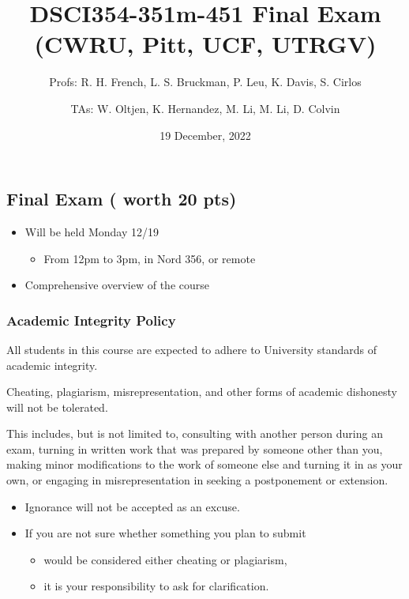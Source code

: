 \documentclass[
]{article}
\title{DSCI354-351m-451 Final Exam (CWRU, Pitt, UCF, UTRGV)}
\subtitle{Profs: R. H. French, L. S. Bruckman, P. Leu, K. Davis, S.
Cirlos}
\author{TAs: W. Oltjen, K. Hernandez, M. Li, M. Li, D. Colvin}
\date{19 December, 2022}
\providecommand{\tightlist}{%
  \setlength{\itemsep}{0pt}\setlength{\parskip}{0pt}}
\begin{document}
\maketitle

{
\hypersetup{linkcolor=}
\setcounter{tocdepth}{6}
\tableofcontents
}
\hypertarget{final-exam-worth-20-pts}{%
\subsection{Final Exam ( worth 20 pts)}\label{final-exam-worth-20-pts}}

\begin{itemize}
\tightlist
\item
  Will be held Monday 12/19

  \begin{itemize}
  \tightlist
  \item
    From 12pm to 3pm, in Nord 356, or remote
  \end{itemize}
\item
  Comprehensive overview of the course
\end{itemize}

\hypertarget{academic-integrity-policy}{%
\subsubsection{Academic Integrity
Policy}\label{academic-integrity-policy}}

All students in this course are expected to adhere to University
standards of academic integrity.

Cheating, plagiarism, misrepresentation, and other forms of academic
dishonesty will not be tolerated.

This includes, but is not limited to, consulting with another person
during an exam, turning in written work that was prepared by someone
other than you, making minor modifications to the work of someone else
and turning it in as your own, or engaging in misrepresentation in
seeking a postponement or extension.

\begin{itemize}
\tightlist
\item
  Ignorance will not be accepted as an excuse.
\item
  If you are not sure whether something you plan to submit

  \begin{itemize}
  \tightlist
  \item
    would be considered either cheating or plagiarism,
  \item
    it is your responsibility to ask for clarification.
  \end{itemize}
\end{itemize}
\end{document}
